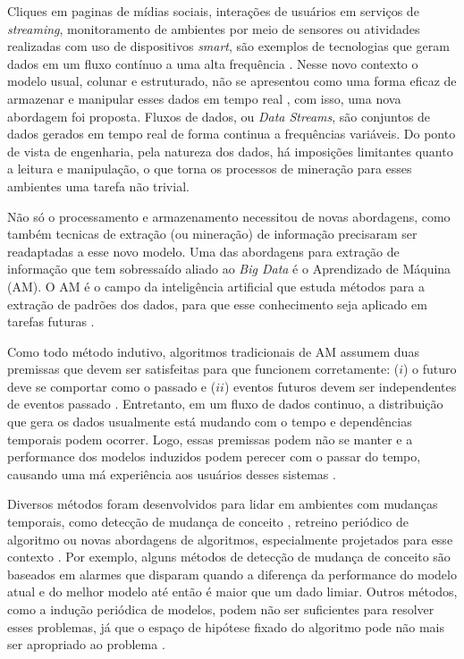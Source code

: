 Cliques em paginas de mídias sociais, interações de usuários em serviços de
\textit{streaming}, monitoramento de ambientes por meio de sensores ou
atividades realizadas com uso de dispositivos \textit{smart}, são exemplos de
tecnologias que geram dados em um fluxo contínuo a uma alta frequência
\cite{gama2004learning}. Nesse novo contexto o modelo usual, colunar e
estruturado, não se apresentou como uma forma eficaz de armazenar e manipular
esses dados em tempo real \cite{gama2007learning}, com isso, uma nova abordagem
foi proposta. Fluxos de dados, ou \textit{Data Streams}, são conjuntos de dados
gerados em tempo real de forma continua a frequências variáveis. Do ponto de
vista de engenharia, pela natureza dos dados, há imposições limitantes quanto
a leitura e manipulação, o que torna os processos de mineração para esses
ambientes uma tarefa não trivial.

Não só o processamento e armazenamento necessitou de novas abordagens, como
também tecnicas de extração (ou mineração) de informação precisaram ser
readaptadas a esse novo modelo. Uma das abordagens para extração de informação
que tem sobressaído aliado ao \textit{Big Data} é o Aprendizado de Máquina
(AM). O AM é o campo da inteligência artificial que estuda métodos para a
extração de padrões dos dados, para que esse conhecimento seja aplicado em
tarefas futuras \cite{mitchell1997machine,friedman2001elements}.

Como todo método indutivo, algoritmos tradicionais de AM assumem duas premissas
que devem ser satisfeitas para que funcionem corretamente: ($i$) o futuro deve
se comportar como o passado e ($ii$) eventos futuros devem ser independentes de
eventos passado \cite{vapnik2013nature}. Entretanto, em um fluxo de dados
continuo, a distribuição que gera os dados usualmente está mudando com o tempo
e dependências temporais podem ocorrer.  Logo, essas premissas podem não se
manter e a performance dos modelos induzidos podem perecer com o passar do
tempo, causando uma má experiência aos usuários desses sistemas
\cite{gama2007learning, Johansson2014}.

Diversos métodos foram desenvolvidos para lidar em ambientes com mudanças
temporais, como detecção de mudança de conceito
\cite{klinkenberg2000detecting}, retreino periódico de algoritmo
\cite{bifet2007learning} ou novas abordagens de algoritmos, especialmente
projetados para esse contexto \cite{zang2014comparative}. Por exemplo, alguns
métodos de detecção de mudança de conceito \cite{gama2010knowledge} são
baseados em alarmes que disparam quando a diferença da performance do modelo
atual e do melhor modelo até então é maior que um dado limiar. Outros métodos,
como a indução periódica de modelos, podem não ser suficientes para resolver
esses problemas, já que o espaço de hipótese fixado do algoritmo pode não mais
ser apropriado ao problema \cite{rossi2014metastream}.

